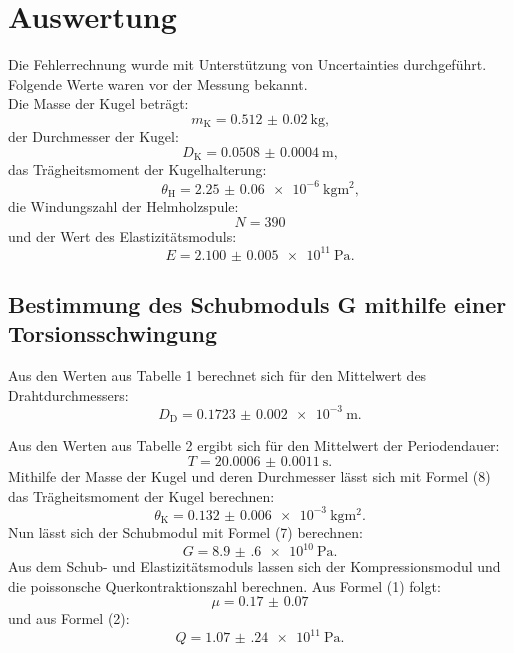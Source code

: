
\section{Auswertung}
\label{sec:Auswertung}
Die Fehlerrechnung wurde mit Unterstützung von Uncertainties \cite{uncertainties} durchgeführt.
Folgende Werte waren vor der Messung bekannt.\\
Die Masse der Kugel beträgt:
\begin{displaymath}
	m_\text{K} = \SI{0.512(20)}{\kilogram}\text{,}
\end{displaymath}
der Durchmesser der Kugel:
\begin{displaymath}
	D_\text{K} = \SI{0.0508(4)}{\meter}\text{,}
\end{displaymath}
das Trägheitsmoment der Kugelhalterung:  
\begin{displaymath}
	\theta_\text{H} = \SI{2.25(6)e-6}{\kilogram\meter\squared}\text{,}
\end{displaymath}
die Windungszahl der Helmholzspule:
\begin{displaymath}
	N = \num{390}
\end{displaymath}
und der Wert des Elastizitätsmoduls:  
\begin{displaymath}
	E = \SI{2.100(5)e11}{\pascal}\text{.}
\end{displaymath}




\subsection{Bestimmung des Schubmoduls G mithilfe einer Torsionsschwingung}

Aus den Werten aus Tabelle 1 berechnet sich für den Mittelwert des Drahtdurchmessers:
\begin{displaymath}
	D_\text{D} = \SI{0.1723(20)e-3}{\meter}\text{.}
\end{displaymath}

Aus den Werten aus Tabelle 2 ergibt sich für den Mittelwert der Periodendauer:
\begin{displaymath}
	T = \SI{20.0006(11)}{\second}\text{.}
\end{displaymath}
Mithilfe der Masse der Kugel und deren Durchmesser lässt sich mit Formel (8) das Trägheitsmoment der Kugel berechnen:
\begin{displaymath}
	\theta_{\text{K}} = \SI{0.132(6)e-3}{\kilogram\meter\squared}\text{.}
\end{displaymath}
Nun lässt sich der Schubmodul mit Formel (7) berechnen:
\begin{displaymath}
	G = \SI{8.9(6)e10}{\pascal}\text{.}
\end{displaymath}
Aus dem Schub- und Elastizitätsmoduls lassen sich der Kompressionsmodul und die poissonsche Querkontraktionszahl berechnen. Aus Formel (1) folgt:
\begin{displaymath}
	\mu = \num{0.17(7)}
\end{displaymath}
und aus Formel (2):
\begin{displaymath}
	Q = \SI{1.07(24)e11}{\pascal}\text{.}
\end{displaymath}

